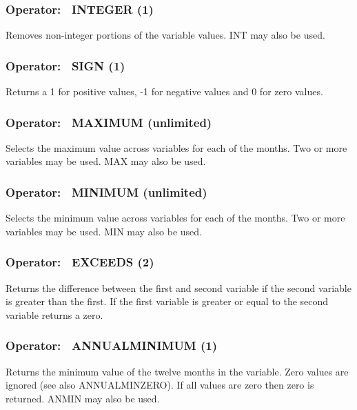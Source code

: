 \subsubsection{Operator:~ INTEGER (1)}\label{operator-integer-1}

Removes non-integer portions of the variable values. INT may also be used.

\subsubsection{Operator:~ SIGN (1)}\label{operator-sign-1}

Returns a 1 for positive values, -1 for negative values and 0 for zero values.

\subsubsection{Operator:~ MAXIMUM (unlimited)}\label{operator-maximum-unlimited}

Selects the maximum value across variables for each of the months. Two or more variables may be used. MAX may also be used.

\subsubsection{Operator:~ MINIMUM (unlimited)}\label{operator-minimum-unlimited}

Selects the minimum value across variables for each of the months. Two or more variables may be used. MIN may also be used.

\subsubsection{Operator:~ EXCEEDS (2)}\label{operator-exceeds-2}

Returns the difference between the first and second variable if the second variable is greater than the first. If the first variable is greater or equal to the second variable returns a zero.

\subsubsection{Operator:~ ANNUALMINIMUM (1)}\label{operator-annualminimum-1}

Returns the minimum value of the twelve months in the variable. Zero values are ignored (see also ANNUALMINZERO). If all values are zero then zero is returned. ANMIN may also be used.

